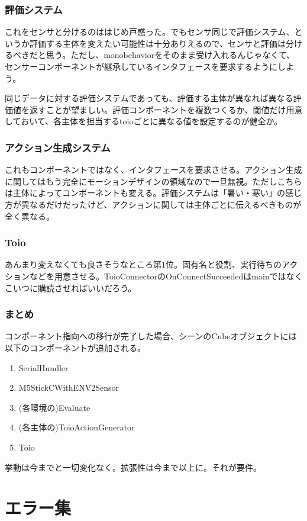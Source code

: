 \documentclass[fleqn,twocolumn]{mynote}
\begin{document}
\subsubsection*{評価システム}
これをセンサと分けるのははじめ戸惑った。でもセンサ同じで評価システム、というか評価する主体を変えたい可能性は十分ありえるので、センサと評価は分けるべきだと思う。ただし、monobehaviorをそのまま受け入れるんじゃなくて、センサーコンポーネントが継承しているインタフェースを要求するようにしよう。

同じデータに対する評価システムであっても、評価する主体が異なれば異なる評価値を返すことが望ましい。評価コンポーネントを複数つくるか、閾値だけ用意しておいて、各主体を担当するtoioごとに異なる値を設定するのが健全か。

\subsubsection*{アクション生成システム}
これもコンポーネントではなく、インタフェースを要求させる。アクション生成に関してはもう完全にモーションデザインの領域なので一旦無視。ただしこちらは主体によってコンポーネントも変える。評価システムは「暑い・寒い」の感じ方が異なるだけだったけど、アクションに関しては主体ごとに伝えるべきものが全く異なる。

\subsubsection*{Toio}
あんまり変えなくても良さそうなところ第1位。固有名と役割、実行待ちのアクションなどを用意させる。ToioConnectorのOnConnectSucceededはmainではなくこいつに購読させればいいだろう。
\subsubsection*{まとめ}
コンポーネント指向への移行が完了した場合、シーンのCubeオブジェクトには以下のコンポーネントが追加される。
\begin{enumerate}
  \item SerialHundler
  \item M5StickCWithENV2Sensor
  \item (各環境の)Evaluate
  \item (各主体の)ToioActionGenerator
  \item Toio
\end{enumerate}

挙動は今までと一切変化なく。拡張性は今まで以上に。それが要件。

\section*{エラー集}
\end{document}
